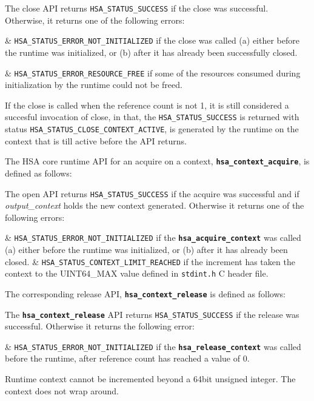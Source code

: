 \documentclass{book}
\newcommand{\diffblock}[1]{#1}
\newcommand{\ttbf}[1]{\diffblock{\texttt{\textbf{#1}}}}
\newcommand{\dbtt}[1]{\diffblock{\texttt{#1}}}
\begin{document}


The close API returns \dbtt{HSA\_STATUS\_SUCCESS} if the close
was successful. Otherwise, it returns one of the following errors:

\begin{easylist}
& \dbtt{HSA\_STATUS\_ERROR\_NOT\_INITIALIZED} if the close was
called (a) either before the runtime was initialized, or (b)
after it has already been successfully closed.

& \dbtt{HSA\_STATUS\_ERROR\_RESOURCE\_FREE} if some of the
resources consumed during initialization by the runtime could not be
freed.
\end{easylist}

If the close is called when the reference count is not 1, it is
still considered a succesful invocation of close, in that, the
\dbtt{HSA\_STATUS\_SUCCESS} is returned with status
\dbtt{HSA\_STATUS\_CLOSE\_CONTEXT\_ACTIVE}, is generated by the
runtime on the context that is till active before the API returns.

The HSA core runtime API for an acquire on a context,
\ttbf{hsa\_context\_acquire}, is defined as follows:



The open API returns \dbtt{HSA\_STATUS\_SUCCESS} if the acquire was
successful and if {\itshape output\_context} holds the new context
generated. Otherwise it returns one of the following errors:

\begin{easylist}
& \dbtt{HSA\_STATUS\_ERROR\_NOT\_INITIALIZED} if the
\ttbf{hsa\_acquire\_context} was called (a) either before the
runtime was initialized, or (b) after it has already been
closed.
& \dbtt{HSA\_STATUS\_CONTEXT\_LIMIT\_REACHED} if the increment has
taken the context to the UINT64\_MAX value defined in
\texttt{stdint.h} C header file.
\end{easylist}

The corresponding release API, \ttbf{hsa\_context\_release} is
defined as follows:



The \ttbf{hsa\_context\_release} API returns
\dbtt{HSA\_STATUS\_SUCCESS} if the release was successful.
Otherwise it returns the following error:

\begin{easylist}
& \dbtt{HSA\_STATUS\_ERROR\_NOT\_INITIALIZED} if the
\ttbf{hsa\_release\_context} was called before the
runtime, after reference count has reached a value of 0.

Runtime context cannot be incremented beyond a 64bit unsigned
integer. The context does not wrap around.

\end{easylist}
\end{document}
